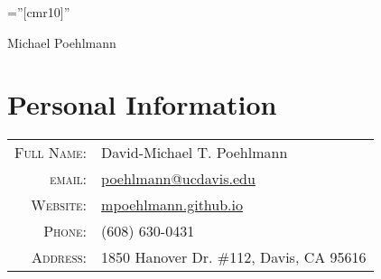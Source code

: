 \documentclass[a4paper,10pt]{article}
\begin{document}
\pagestyle{empty} %
\font\fb=''[cmr10]'' %


\par{\centering
		{\Huge Michael Poehlmann   %
	}\bigskip\par}



\section{Personal Information}
\begin{tabular}{rl}
\textsc{Full Name:}             & David-Michael T. Poehlmann \\ %
\textsc{email:}                 & \href{mailto:poehlmann@ucdavis.edu}{poehlmann@ucdavis.edu} \\
\textsc{Website:}               & \href{https://mpoehlmann.github.io}{mpoehlmann.github.io}\\
\textsc{Phone:}                 & (608) 630-0431\\
\textsc{Address:}               & 1850 Hanover Dr. \#112, Davis, CA 95616 \\
\end{tabular}


\end{document}

